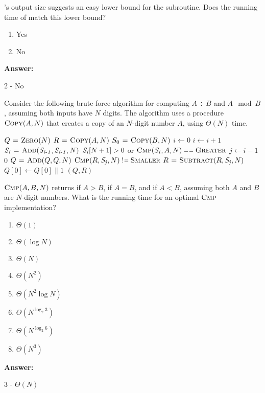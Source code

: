 \documentclass[12pt,twoside]{article}
\newcommand{\isnotequal}{\mathrel{\scalebox{0.8}[1]{!}\hspace*{1pt}\scalebox{0.8}[1]{=}}}
\newcommand{\answer}{
 \par\medskip
 \textbf{Answer:}
}
\newcommand{\answerIf}{ \answer
2 - No
}
\newcommand{\answerIg}{ \answer
3 - $\Theta(N)$
}
\begin{document}
\begin{problems}
\begin{problemparts}
\problempart {} 's output size suggests an easy lower
bound for the subroutine. Does the running time of  match this
lower bound?
\begin{enumerate}
  \item Yes
  \item No
\end{enumerate}
\answerIf

\end{problemparts}

Consider the following brute-force algorithm for computing $A \div B$ and $A
\mod B$, assuming both inputs have $N$ digits. The algorithm uses a procedure
$\textnormal{\scshape Copy}(A, N)$ that creates a copy of an $N$-digit number $A$, using
$\Theta(N)$ time.

\begin{codebox}
\li $Q \mathrel{\hspace{1pt}=\hspace{1pt}} \textnormal{\scshape Zero}(N)$ 
\li $R \mathrel{\hspace{1pt}=\hspace{1pt}} \textnormal{\scshape Copy}(A, N)$ 
\li $S_0 \mathrel{\hspace{1pt}=\hspace{1pt}} \textnormal{\scshape Copy}(B, N)$ 
\li $i \gets 0$
\li \Repeat \label{li:divmod-repeat}
\li   $i \gets i + 1$
\li   $\id{S_i} \gets \proc{Add}(\id{S_{i - 1}}, \id{S_{i - 1}}, N)$
\li \Until $\id{S_i}[N + 1] > 0$ or $\proc{Cmp}(S_i, A, N) \isequal
            \const{Greater}$
\li \For $j \gets i - 1$ \Downto $0$ \label{li:divmod-for}
\li   \Do
        $Q \mathrel{\hspace{1pt}=\hspace{1pt}} \textnormal{\scshape Add}(Q, Q, N)$
\li     \If $\proc{Cmp}(R, \id{S_j}, N) \isnotequal \const{Smaller}$
\li     \Then
           $R \gets \proc{Subtract}(R, \id{S_j}, N)$
\li        $Q[0] \gets Q[0] \| 1$ 
        \End
      \End
\li \Return $(Q, R)$
\end{codebox}

\begin{problemparts}
\problempart {} $\textnormal{\scshape Cmp}(A, B, N)$ returns  if $A >
B$,  if $A = B$, and  if $A < B$, assuming both $A$
and $B$ are $N$-digit numbers. What is the running time for an optimal
$\textnormal{\scshape Cmp}$ implementation?
\begin{enumerate}
  \item $\Theta(1)$
  \item $\Theta(\log N)$
  \item $\Theta(N)$
  \item $\Theta(N^2)$
  \item $\Theta(N^2 \log N)$
  \item $\Theta(N^{\log_2 3})$
  \item $\Theta(N^{\log_2 6})$
  \item $\Theta(N^3)$
\end{enumerate}
\answerIg


\end{problemparts}
\end{problems}
\end{document}

